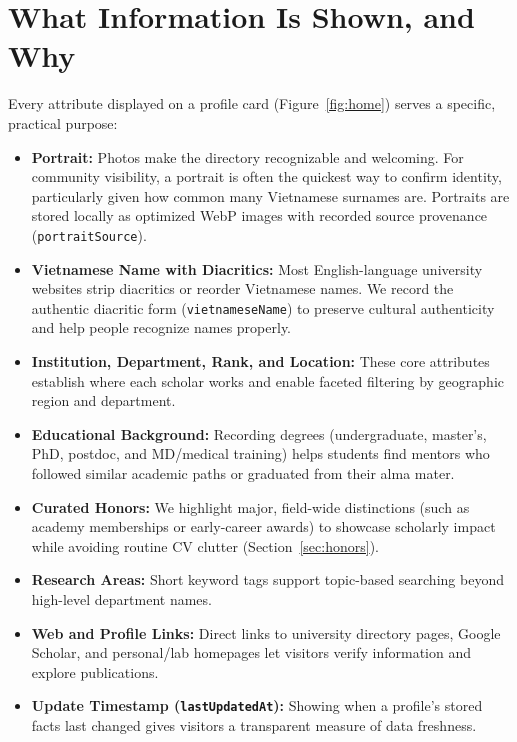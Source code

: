 \documentclass[11pt]{article}
\newcommand{\code}[1]{\texttt{\small #1}}
\begin{document}
\section{What Information Is Shown, and Why}
\label{sec:whatshown}
Every attribute displayed on a profile card (Figure~\ref{fig:home}) serves a specific, practical purpose:
\begin{itemize}
\item \textbf{Portrait:} Photos make the directory recognizable and welcoming. For community visibility, a portrait is often the quickest way to confirm identity, particularly given how common many Vietnamese surnames are. Portraits are stored locally as optimized WebP images with recorded source provenance (\code{portraitSource}).
\item \textbf{Vietnamese Name with Diacritics:} Most English-language university websites strip diacritics or reorder Vietnamese names. We record the authentic diacritic form (\code{vietnameseName}) to preserve cultural authenticity and help people recognize names properly.
\item \textbf{Institution, Department, Rank, and Location:} These core attributes establish where each scholar works and enable faceted filtering by geographic region and department.
\item \textbf{Educational Background:} Recording degrees (undergraduate, master's, PhD, postdoc, and MD/medical training) helps students find mentors who followed similar academic paths or graduated from their alma mater.
\item \textbf{Curated Honors:} We highlight major, field-wide distinctions (such as academy memberships or early-career awards) to showcase scholarly impact while avoiding routine CV clutter (Section~\ref{sec:honors}).
\item \textbf{Research Areas:} Short keyword tags support topic-based searching beyond high-level department names.
\item \textbf{Web and Profile Links:} Direct links to university directory pages, Google Scholar, and personal/lab homepages let visitors verify information and explore publications.
\item \textbf{Update Timestamp (\code{lastUpdatedAt}):} Showing when a profile's stored facts last changed gives visitors a transparent measure of data freshness.
\end{itemize}
\end{document}
